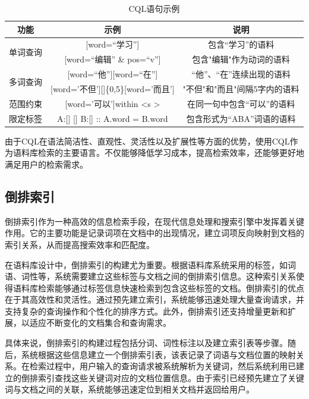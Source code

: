 \documentclass[11pt]{article}
\begin{document}
\begin{CJK*}{UTF8}{gbsn}
\begin{table}[h]
	\begin{center}
		\begin{tabular}{c|c|c}
			\hline \bf 功能 & \bf 示例 & \bf 说明 \\ \hline
			\multirow{2}{*}{单词查询}& [word=“学习”] & 包含“学习”的语料 \\ \cline{2-3} & [word=“编辑” \& pos=“v”] & 包含"编辑"作为动词的语料 \\ \cline{1-3}
			\multirow{2}{*}{多词查询} 
			& [word=“他”][word=“在”] & “他”、“在”连续出现的语料  \\ \cline{2-3} & [word='不但'][]\{0,5\}[word='而且'] & "不但"和"而且"间隔5字内的语料 \\ \hline
			范围约束 & [word='可以']within \textless s \textgreater & 在同一句中包含“可以”的语料 \\ \cline{1-3}
			限定标签 & A:[] [] B:[]  :: A.word = B.word & 包含形式为“ABA”词语的语料 \\
			\hline
		\end{tabular}
	\end{center}
	\caption{\label{cqltable} CQL语句示例}
\end{table}



由于CQL在语法简洁性、直观性、灵活性以及扩展性等方面的优势，使用CQL作为语料库检索的主要语言。不仅能够降低学习成本，提高检索效率，还能够更好地满足用户的检索需求。

\subsection{倒排索引}

倒排索引\cite{Salton1974A}作为一种高效的信息检索手段，在现代信息处理和搜索引擎中发挥着关键作用。它的主要功能是记录词项在文档中的出现情况，建立词项反向映射到文档的索引关系，从而提高搜索效率和匹配度。

在语料库设计中，倒排索引的构建尤为重要。根据语料库系统采用的标签，如词语、词性等，系统需要建立这些标签与文档之间的倒排索引信息。这种索引关系使得语料库检索能够通过标签信息快速检索到包含这些标签的文档。倒排索引的优点在于其高效性和灵活性。通过预先建立索引，系统能够迅速处理大量查询请求，并支持复杂的查询操作和个性化的排序方式。此外，倒排索引还支持增量更新和扩展，以适应不断变化的文档集合和查询需求。

具体来说，倒排索引的构建过程包括分词、词性标注以及建立索引表等步骤。随后，系统根据这些信息建立一个倒排索引表，该表记录了词语与文档位置的映射关系。在检索过程中，用户输入的查询请求被系统解析为关键词，然后系统利用已建立的倒排索引查找这些关键词对应的文档位置信息。由于索引已经预先建立了关键词与文档之间的关联，系统能够迅速定位到相关文档并返回给用户。


\end{CJK*}
\end{document}
